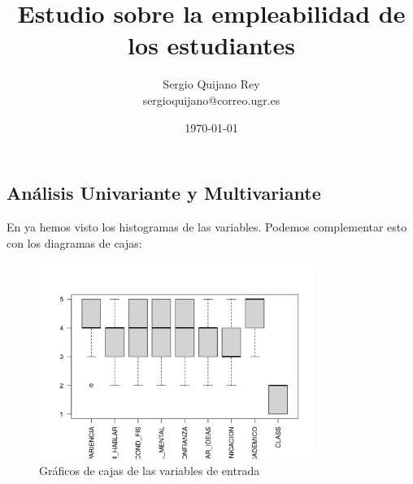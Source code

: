 \documentclass[11pt]{article}
\title{
    Estudio sobre la empleabilidad de los estudiantes
}
\author{
    {Sergio Quijano Rey}\\
    {sergioquijano@correo.ugr.es}
}
\date{\today}
\begin{document}
\maketitle
\pagebreak

\tableofcontents


\listoffigures

\listoftables

{}

\pagebreak



\newpage


\newpage


\newpage



\subsection{Análisis Univariante y Multivariante}

En  ya hemos visto los histogramas de las variables. Podemos complementar esto con los diagramas de cajas:

\begin{figure}[H]
    \centering
    \includegraphics[width=0.8\textwidth]{grafico_cajas}
    \caption{Gráficos de cajas de las variables de entrada}
\end{figure}
\end{document}
